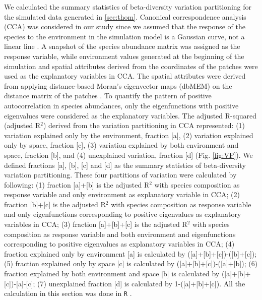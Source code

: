 	We calculated the summary statistics of beta-diversity variation partitioning for the simulated data generated in \autoref{sec:thom}. Canonical correspondence analysis (CCA) was considered in our study since we assumed that the response of the species to the environment in the simulation model is a Gaussian curve, not a linear line \citep{ter1986canonical, legendre2012numerical}. A snapshot of the species abundance matrix was assigned as the response variable, while environment values generated at the beginning of the simulation and spatial attributes derived from the coordinates of the patches were used as the explanatory variables in CCA. The spatial attributes were derived from applying distance-based Moran's eigenvector maps (dbMEM) on the distance matrix of the patches \citep{borcard2002all}. To quantify the pattern of positive autocorrelation in species abundances, only the eigenfunctions with positive eigenvalues were considered as the explanatory variables. The adjusted R-squared (adjusted R$^2$) \citep[pp.~633]{legendre2012numerical} derived from the variation partitioning in CCA represented: (1) variation explained only by the environment, fraction [a], (2) variation explained only by space, fraction [c], (3) variation explained by both environment and space, fraction [b], and (4) unexplained variation, fraction [d] (Fig. \ref{fig:VP}). We defined fractions [a], [b], [c] and [d] as the summary statistics of beta-diversity variation partitioning. These four partitions of variation were calculated by following: (1) fraction [a]+[b] is the adjusted R$^2$ with species composition as response variable and only environment as explanatory variable in CCA; (2) fraction [b]+[c] is the adjusted R$^2$ with species composition as response variable and only eigenfunctions corresponding to positive eigenvalues as explanatory variables in CCA; (3) fraction [a]+[b]+[c] is the adjusted R$^2$ with species composition as response variable and both environment and eigenfunctions corresponding to positive eigenvalues as explanatory variables in CCA; (4) fraction explained only by environment [a] is calculated by ([a]+[b]+[c])-([b]+[c]); (5) fraction explained only by space [c] is calculated by ([a]+[b]+[c])-([a]+[b]); (6) fraction explained by both environment and space [b] is calculated by ([a]+[b]+[c])-[a]-[c]; (7) unexplained fraction [d] is calculated by 1-([a]+[b]+[c]). All the calculation in this section was done in \texttt{R} \citep{R}.
	
